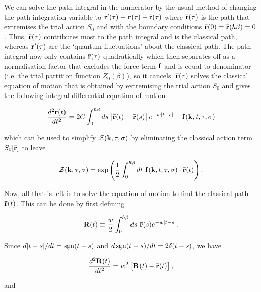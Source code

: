 We can solve the path integral in the numerator by the usual method of changing the path-integration variable to $\vb{r'}(\tau) \equiv \vb{r}(\tau) - \vb{\bar{r}}(\tau)$ where $\vb{\bar{r}}(\tau)$ is the path that extremises the trial action $S_0$ and with the boundary conditions $\vb{\bar{r}}(0) = \vb{\bar{r}}(\hslash\beta) = 0$. Thus, $\vb{\bar{r}}(\tau)$ contributes most to the path integral and is the classical path, whereas $\vb{r'}(\tau)$ are the `quantum fluctuations' about the classical path. The path integral now only contains $\vb{\bar{r}}(\tau)$ quadratically which then separates off as a normalisation factor that excludes the force term $\vb{f}$ and is equal to denominator (i.e. the trial partition function $Z_0(\beta)$), so it cancels. $\vb{\bar{r}}(\tau)$ solves the classical equation of motion that is obtained by extremising the trial action $S_0$ and gives the following integral-differential equation of motion

\begin{equation}
    \frac{d^2 \vb{\bar{r}}(t)}{dt^2} = 2C \int^{\hslash\beta}_0 ds \left[\vb{\bar{r}}(t) - \vb{\bar{r}}(s)\right] e^{-w\abs{t - s}} - \vb{f}(\vb{k}, t, \tau, \sigma) 
\end{equation}

which can be used to simplify $\mathcal{Z}(\vb{k}, \tau, \sigma)$ by eliminating the classical action term $S_0[\vb{\bar{r}}]$ to leave

\begin{equation}
    \mathcal{Z}(\vb{k}, \tau, \sigma) = \exp\left( \frac{1}{2} \int^{\hslash\beta}_0 dt\ \vb{f}(\vb{k}, t, \tau, \sigma) \cdot \vb{\bar{r}}(t) \right).
\end{equation}

Now, all that is left is to solve the equation of motion to find the classical path $\vb{\bar{r}}(t)$. This can be done by first defining 

\begin{equation}
    \vb{R}(t) \equiv \frac{w}{2} \int^{\hslash\beta}_0 ds\ \vb{\bar{r}}(s) e^{-w\abs{t - s}}.
\end{equation}

Since $d\abs{t-s}/dt = \operatorname{sgn}(t-s)$ and $d\operatorname{sgn}(t-s)/dt = 2\delta(t-s)$, we have

\begin{equation}
    \frac{d^2\vb{R}(t)}{dt^2} = w^2 \left[\vb{R}(t) - \vb{\bar{r}}(t)\right],
\end{equation}

and

